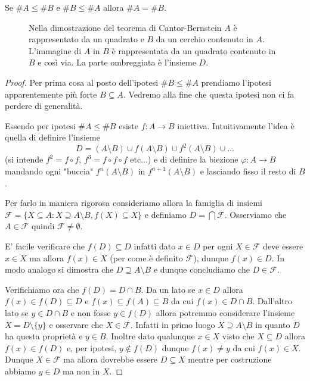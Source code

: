 \documentclass[italian,a4paper,twosides,headinclude]{scrbook}
\renewcommand{\phi}{\varphi}
\renewcommand{\subset}{\subseteq}
\renewcommand{\supset}{\supseteq}
\newcommand{\F}{\mathcal F}
\begin{document}
\begin{theorem}
Se $\#A \le \#B$ e $\#B \le \#A$ allora $\#A = \#B$.
\end{theorem}
%
\begin{figure}
  \centering
  
  \caption{
  Nella dimostrazione del teorema di Cantor-Bernstein
  $A$ è rappresentato da un quadrato e $B$ da un cerchio contenuto
  in $A$. L'immagine di $A$ in $B$ è rappresentata da un quadrato contenuto
  in $B$ e così via. La parte ombreggiata è l'insieme $D$.
  }
  \label{fig:omotetia}
\end{figure}
%
\begin{proof}
Per prima cosa al posto dell'ipotesi $\# B \le \#A$ prendiamo
l'ipotesi apparentemente più forte $B\subset A$.
Vedremo alla fine che questa ipotesi non ci fa perdere di generalità.

Essendo per ipotesi $\#A \le \#B$ esiste $f\colon A \to B$ iniettiva.
Intuitivamente l'idea è quella di definire l'insieme
\[
 D = (A\setminus B)  \cup f(A\setminus B) \cup f^2(A\setminus B) \cup \dots
\]
(si intende $f^2=f\circ f$, $f^3=f\circ f\circ f$ etc...)
e di definire la biezione $\phi \colon A \to B$ mandando ogni "buccia"
$f^n(A\setminus B)$ in $f^{n+1}(A\setminus B)$ e lasciando fisso
il resto di $B$.

Per farlo in maniera rigorosa
consideriamo allora la famiglia di insiemi $\F = \{X \subset A \colon X \supset A \setminus B, f(X) \subset X\}$ e definiamo $D = \bigcap \F$.
Osserviamo che $A \in \F$ quindi $\F\neq \emptyset$.

E' facile verificare che $f(D) \subset D$ infatti dato $x\in D$ per ogni $X\in \F$ deve essere $x\in X$ ma allora $f(x) \in X$ (per come è definito $\F$), dunque $f(x) \in D$. In modo analogo si dimostra che $D\supset A\setminus B$ e dunque concludiamo che $D\in \F$.

Verifichiamo ora che $f(D)=D\cap B$. Da un lato se $x\in D$ allora
$f(x) \in f(D)\subset D$ e $f(x)\subset f(A)\subset B$ da cui $f(x) \in D\cap B$.
Dall'altro lato se $y\in D \cap B$ e non fosse $y \in f(D)$
allora potremmo considerare l'insieme $X=D\setminus\{y\}$
e osservare che $X\in \F$.
Infatti in primo luogo $X \supset A \setminus B$ in quanto $D$ ha questa proprietà e $y \in B$.
Inoltre dato qualunque $x \in X$ visto che $X\subset D$ allora
$f(x) \in f(D)$ e, per ipotesi,
$y\not \in f(D)$ dunque $f(x)\neq y$ da cui $f(x) \in X$.
Dunque $X\in \F$ ma allora dovrebbe essere $D\subset X$ mentre
per costruzione abbiamo $y\in D$ ma non in $X$.


\end{proof}
\end{document}
